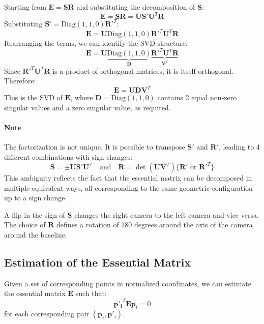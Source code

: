 \documentclass[11pt,a4paper]{article}
\theoremstyle{definition}
\theoremstyle{plain}
\theoremstyle{remark}
\begin{document}
Starting from $\mathbf{E} = \mathbf{S} \mathbf{R}$ and substituting the decomposition of $\mathbf{S}$:
\begin{equation} \nonumber
    \mathbf{E} = \mathbf{S} \mathbf{R} = \mathbf{U} \mathbf{S'} \mathbf{U}^T \mathbf{R}
\end{equation}
Substituting $\mathbf{S'} = \text{Diag}(1,1,0) \mathbf{R'}^T$:
\begin{equation} \nonumber
    \mathbf{E} = \mathbf{U} \text{Diag}(1,1,0) \mathbf{R'}^T \mathbf{U}^T \mathbf{R}
\end{equation}
Rearranging the terms, we can identify the SVD structure:
\begin{equation} \nonumber
    \mathbf{E} = \mathbf{U} \underbrace{\text{Diag}(1,1,0)}_{\mathbf{D}} \underbrace{\mathbf{R'}^T \mathbf{U}^T \mathbf{R}}_{\mathbf{V}^T}
\end{equation}
Since $\mathbf{R'}^T \mathbf{U}^T \mathbf{R}$ is a product of orthogonal matrices, it is itself orthogonal. Therefore:
\begin{equation} \label{eq:E_SVD_from_SR}
    \mathbf{E} = \mathbf{U} \mathbf{D} \mathbf{V}^T
\end{equation}
This is the SVD of $\mathbf{E}$, where $\mathbf{D} = \text{Diag}(1,1,0)$ contains 2 equal non-zero singular values and a zero singular value, as required.

\paragraph{Note}
The factorization is not unique. It is possible to transpose $\mathbf{S'}$ and $\mathbf{R'}$, leading to 4 different combinations with sign changes:
\begin{equation} \nonumber
    \mathbf{S} = \pm \mathbf{U} \mathbf{S'} \mathbf{U}^T \quad \text{and} \quad \mathbf{R} = \det(\mathbf{U} \mathbf{V}^T) \{\mathbf{R'} \text{ or } \mathbf{R'}^T\}
\end{equation}
This ambiguity reflects the fact that the essential matrix can be decomposed in multiple equivalent ways, all corresponding to the same geometric configuration up to a sign change.

A flip in the sign of $\mathbf{S}$ changes the right camera to the left camera and vice versa.
The choice of $\mathbf{R}$ defines a rotation of 180 degrees around the axis of the camera around the baseline.

\subsection{Estimation of the Essential Matrix}\label{subsec:estimation_essential}
Given a set of corresponding points in normalized coordinates, we can estimate the essential matrix
$\mathbf{E}$ such that:
\begin{equation} \label{eq:epipolar_constraint_points}
    \mathbf{{p}'_i}^T \mathbf{E} \mathbf{p}_i = 0
\end{equation}
for each corresponding pair $(\mathbf{p}_i, \mathbf{p}'_i)$.
\end{document}
